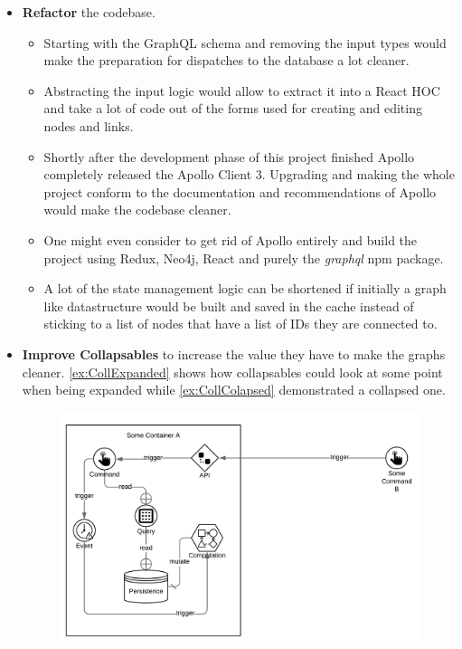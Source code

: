 \begin{itemize}
\item \textbf{Refactor} the codebase.
\begin{itemize}
\item Starting with the GraphQL schema and removing the input types would make the preparation for dispatches to the database a lot cleaner. 
\item Abstracting the input logic would allow to extract it into a React HOC and take a lot of code out of the forms used for creating and editing nodes and links.
\item Shortly after the development phase of this project finished Apollo completely released the Apollo Client 3. Upgrading and making the whole project conform to the documentation and recommendations of Apollo would make the codebase cleaner.
\item One might even consider to get rid of Apollo entirely and build the project using Redux, Neo4j, React and purely the \emph{graphql} npm package.
\item A lot of the state management logic can be shortened if initially a graph like datastructure would be built and saved in the cache instead of sticking to a list of nodes that have a list of IDs they are connected to.
\end{itemize}

\item \textbf{Improve Collapsables} to increase the value they have to make the graphs cleaner. \autoref{ex:CollExpanded} shows how collapsables could look at some point when being expanded while \autoref{ex:CollColapsed} demonstrated a collapsed one.

\begin{figure}
\label{ex:CollExpanded}
\centering
\includegraphics[scale=.2]{Bilder/CollapsableEx.png}
\end{figure}


\end{itemize}
